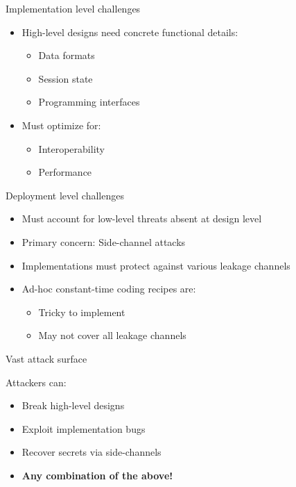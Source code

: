 \documentclass[aspectratio=169, lualatex, handout]{beamer}
\begin{document}
\begin{frame}{Implementation level challenges}
	\begin{itemize}
		\item High-level designs need concrete functional details:
		      \begin{itemize}
			      \item Data formats
			      \item Session state
			      \item Programming interfaces
		      \end{itemize}
		\item Must optimize for:
		      \begin{itemize}
			      \item Interoperability
			      \item Performance
		      \end{itemize}
	\end{itemize}
\end{frame}

\begin{frame}{Deployment level challenges}
	\begin{itemize}
		\item Must account for low-level threats absent at design level
		\item Primary concern: Side-channel attacks
		\item Implementations must protect against various leakage channels
		\item Ad-hoc constant-time coding recipes are:
		      \begin{itemize}
			      \item Tricky to implement
			      \item May not cover all leakage channels
		      \end{itemize}
	\end{itemize}
\end{frame}

\begin{frame}{Vast attack surface}
	\begin{center}
		\Large Attackers can:
		\vspace{1em}
	\end{center}
	\begin{itemize}
		\item Break high-level designs
		\item Exploit implementation bugs
		\item Recover secrets via side-channels
		\item \textbf{Any combination of the above!}
	\end{itemize}
\end{frame}
\end{document}
